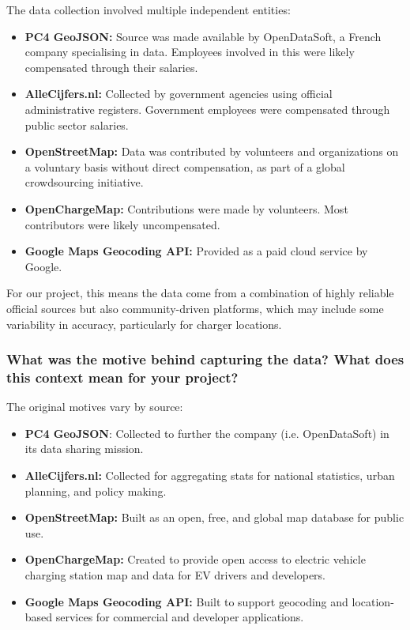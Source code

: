 \documentclass{article}
\newcommand{\question}[1]{#1}
\begin{document}
The data collection involved multiple independent entities:

\begin{itemize}

	\item \textbf{PC4 GeoJSON:} Source was made available by OpenDataSoft, a French company specialising in data. Employees involved in this were likely compensated through their salaries.

	\item \textbf{AlleCijfers.nl:} Collected by government agencies using official administrative registers. Government employees were compensated through public sector salaries.

	\item \textbf{OpenStreetMap:} Data was contributed by volunteers and organizations on a voluntary basis without direct compensation, as part of a global crowdsourcing initiative.

	\item \textbf{OpenChargeMap:} Contributions were made by volunteers. Most contributors were likely uncompensated.

	\item \textbf{Google Maps Geocoding API:} Provided as a paid cloud service by Google.

\end{itemize}

For our project, this means the data come from a combination of highly reliable official sources but also community-driven platforms, which may include some variability in accuracy, particularly for charger locations.

\question{\subsubsection*{What was the motive behind capturing the data? What does this context mean for your project?}}

The original motives vary by source:

\begin{itemize}
	\item \textbf{PC4 GeoJSON}: Collected to further the company (i.e. OpenDataSoft) in its data sharing mission.

	\item \textbf{AlleCijfers.nl:} Collected for aggregating stats for national statistics, urban planning, and policy making.

	\item \textbf{OpenStreetMap:} Built as an open, free, and global map database for public use.

	\item \textbf{OpenChargeMap:} Created to provide open access to electric vehicle charging station map and data for EV drivers and developers.

	\item \textbf{Google Maps Geocoding API:} Built to support geocoding and location-based services for commercial and developer applications.

\end{itemize}
\end{document}
